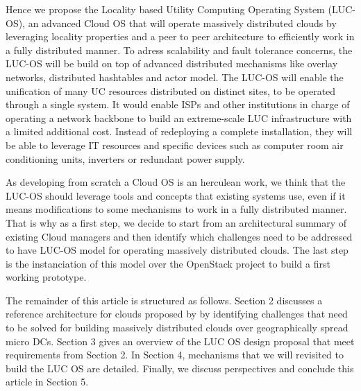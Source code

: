 Hence we propose the Locality based Utility Computing Operating System (LUC-OS),
an advanced Cloud OS that will operate massively distributed clouds by 
leveraging locality properties and a peer to peer architecture to efficiently 
work in a fully distributed manner. To adress scalability and fault tolerance 
concerns, the LUC-OS will be build on top of advanced distributed mechanisms 
like overlay networks, distributed hashtables and actor model. The LUC-OS will 
enable the unification of many UC resources distributed on distinct sites, to be
operated through a single system. It would enable ISPs and other institutions in charge of operating a network backbone to build
an extreme-scale LUC infrastructure with a limited additional cost. Instead of 
redeploying a complete installation, they will be able to leverage IT resources 
and specific devices such as computer room air conditioning units, inverters or 
redundant power supply.

As developing from scratch a Cloud OS is an herculean work, we think that the 
LUC-OS should leverage tools and concepts that existing systems use, even if 
it means modifications to some mechanisms to work in a fully distributed manner.
That is why as a first step, we decide to start from an architectural summary of 
existing Cloud managers and then identify which challenges need to be addressed
to have LUC-OS model for operating massively distributed clouds. The last step 
is the instanciation of this model over the OpenStack project to build a first
working prototype.

The remainder of this article is structured as follows. Section 2 discusses a 
reference architecture for clouds proposed by \cite{moreno2012iaas} by 
identifying challenges that need to be solved for building massively distributed 
clouds over geographically spread micro DCs. Section 3 gives an overview of the 
LUC OS design proposal that meet requirements from Section 2. In Section 4, 
mechanisms that we will revisited to build the LUC OS are detailed. Finally, we 
discuss perspectives and conclude this article in Section 5.